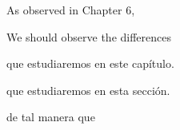 




As observed in Chapter 6, 



We should observe the differences




que estudiaremos en este capítulo.


que estudiaremos en esta sección.



de tal manera que 



